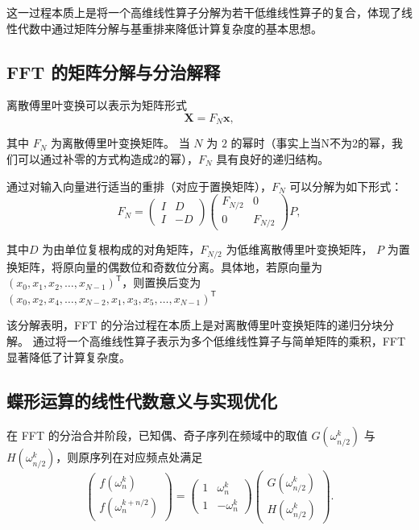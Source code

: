 \documentclass[12pt,a4paper]{article}
\begin{document}
这一过程本质上是将一个高维线性算子分解为若干低维线性算子的复合，体现了线性代数中通过矩阵分解与基重排来降低计算复杂度的基本思想。

\subsection{FFT 的矩阵分解与分治解释}

离散傅里叶变换可以表示为矩阵形式
\begin{equation*}
\mathbf{X} = F_N \mathbf{x},
\end{equation*}

其中 $F_N$ 为离散傅里叶变换矩阵。
当 $N$ 为 $2$ 的幂时（事实上当N不为2的幂，我们可以通过补零的方式构造成2的幂），$F_N$ 具有良好的递归结构。

通过对输入向量进行适当的重排（对应于置换矩阵），$F_N$ 可以分解为如下形式：
\begin{equation}
F_N
=
\begin{pmatrix}
I & D \\
I & -D
\end{pmatrix}
\begin{pmatrix}
F_{N/2} & 0 \\
0 & F_{N/2}
\end{pmatrix}
P,
\end{equation}

其中$D$ 为由单位复根构成的对角矩阵，$F_{N/2}$ 为低维离散傅里叶变换矩阵，
 $P$ 为置换矩阵，将原向量的偶数位和奇数位分离。具体地，若原向量为 $(x_0, x_1, x_2, \ldots, x_{N-1})^\mathsf{T}$，则置换后变为 $(x_0, x_2, x_4, \ldots, x_{N-2}, x_1, x_3, x_5, \ldots, x_{N-1})^\mathsf{T}$

该分解表明，FFT 的分治过程在本质上是对离散傅里叶变换矩阵的递归分块分解。
通过将一个高维线性算子表示为多个低维线性算子与简单矩阵的乘积，FFT 显著降低了计算复杂度。


\subsection{蝶形运算的线性代数意义与实现优化}
在 FFT 的分治合并阶段，已知偶、奇子序列在频域中的取值 $G(\omega_{n/2}^k)$ 与 $H(\omega_{n/2}^k)$，则原序列在对应频点处满足
\begin{equation}
\begin{pmatrix}
 f(\omega_n^k)\\
 f(\omega_n^{k+n/2})
\end{pmatrix}
=
\begin{pmatrix}
1 & \omega_n^k\\
1 & -\omega_n^k
\end{pmatrix}
\begin{pmatrix}
G(\omega_{n/2}^k)\\
H(\omega_{n/2}^k)
\end{pmatrix}.
\end{equation}
\end{document}
